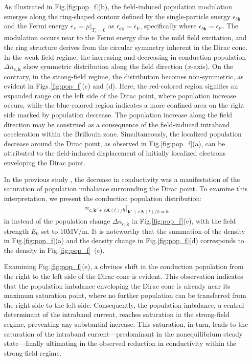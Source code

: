 As illustrated in Fig.\ref{fig:pop_f}(b), the field-induced population modulation emerges along the
ring-shaped contour defined by the single-particle energy $\epsilon_{b\mathbf k}$ and the Fermi
energy $\epsilon_{\mathrm F}=\mu\big |_{T_e=0}$ as $\epsilon_{b\mathbf k}=\epsilon_{\mathrm F}$,
specifically where $\epsilon_{b \mathbf k}=\epsilon_{\mathrm F}$. The modulation occurs near to the Fermi energy due to the mild field excitation, and the ring structure derives from the circular symmetry inherent in the Dirac cone. In the weak field regime, the increasing and decreasing in conduction population $\Delta n_{c,\mathbf{k}}$ show symmetric distribution along the field direction ($x$-axis). On the contrary, in the strong-field regime, the distribution becomes non-symmetric, as evident in Figs.\ref{fig:pop_f}(c) and (d). Here, the red-colored region signifies an expanded range on the left side of the Dirac point, where population increase occurs, while the blue-colored region indicates a more confined area on the right side marked by population decrease. The population increase along the field direction may be construed as a consequence of the field-induced intraband acceleration within the Brillouin zone. Simultaneously, the localized population decrease around the Dirac point, as observed in Fig.\ref{fig:pop_f}(a), can be attributed to the field-induced displacement of initially localized electrons enveloping the Dirac point.

In the previous study \cite{sato2021nonlinear}, the decrease in conductivity was a manifestation of the
saturation of population imbalance surrounding the Dirac point. To examine this interpretation,
we present the conduction population distribution:
\begin{align}
	n_{c,\mathbf k'+e\mathbf A(t)/\hbar}\big |_{\mathbf k'+e\mathbf A(t)/\hbar=\mathbf k}
\end{align}
in instead of the population change $\Delta n_{c,\mathbf{k}}$ in Fig.\ref{fig:pop_f}(e), with the field strength $E_0$ set to $10$MV/m. It is noteworthy that the summation of the density in Fig.\ref{fig:pop_f}(a) and the density change in Fig.\ref{fig:pop_f}(d) corresponds to the density in Fig.\ref{fig:pop_f}~(e).

Examining Fig.\ref{fig:pop_f}(e), a obviuos shift in the conduction population from the right to the left side of the Dirac cone is evident. This observation indicates that the population imbalance enveloping the Dirac cone is already near its maximum saturation point, where no further population can be transferred from the right side to the left side. Consequently, the population imbalance, a central determinant of the intraband current, reaches saturation in the strong-field regime, preventing any substantial increase. This saturation, in turn, leads to the saturation of the intraband current—predominant in the nonequilibrium steady state—finally ultimating in the observed reduction in conductivity within the strong-field regime.

